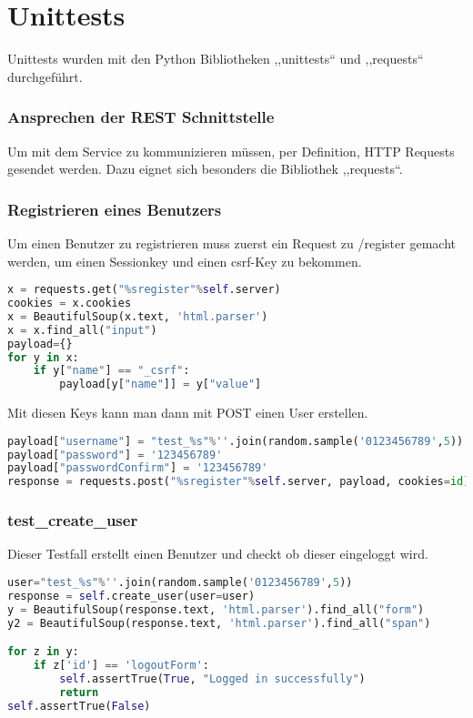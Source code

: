 \section{Unittests}
Unittests wurden mit den Python Bibliotheken ,,unittests`` und ,,requests`` 
durchgeführt. 

\subsubsection{Ansprechen der REST Schnittstelle}
Um mit dem Service zu kommunizieren müssen, per Definition, HTTP Requests 
gesendet werden. Dazu eignet sich besonders die Bibliothek ,,requests``.

\subsubsection{Registrieren eines Benutzers}
Um einen Benutzer zu registrieren muss zuerst ein Request zu /register gemacht 
werden, um einen Sessionkey und einen csrf-Key zu bekommen.  
\begin{lstlisting}[language=Python]
x = requests.get("%sregister"%self.server)
cookies = x.cookies
x = BeautifulSoup(x.text, 'html.parser')
x = x.find_all("input")
payload={}
for y in x:
	if y["name"] == "_csrf":
	    payload[y["name"]] = y["value"]
\end{lstlisting}

Mit diesen Keys kann man dann mit POST einen User erstellen.

\begin{lstlisting}[language=Python]
payload["username"] = "test_%s"%''.join(random.sample('0123456789',5))
payload["password"] = '123456789'
payload["passwordConfirm"] = '123456789'
response = requests.post("%sregister"%self.server, payload, cookies=id)
\end{lstlisting}

\subsubsection{test\_create\_user}
Dieser Testfall erstellt einen Benutzer und checkt ob dieser eingeloggt wird.
\begin{lstlisting}[language=Python]
user="test_%s"%''.join(random.sample('0123456789',5))
response = self.create_user(user=user)
y = BeautifulSoup(response.text, 'html.parser').find_all("form")
y2 = BeautifulSoup(response.text, 'html.parser').find_all("span")

for z in y:
    if z['id'] == 'logoutForm':
        self.assertTrue(True, "Logged in successfully")
        return
self.assertTrue(False)
\end{lstlisting}

